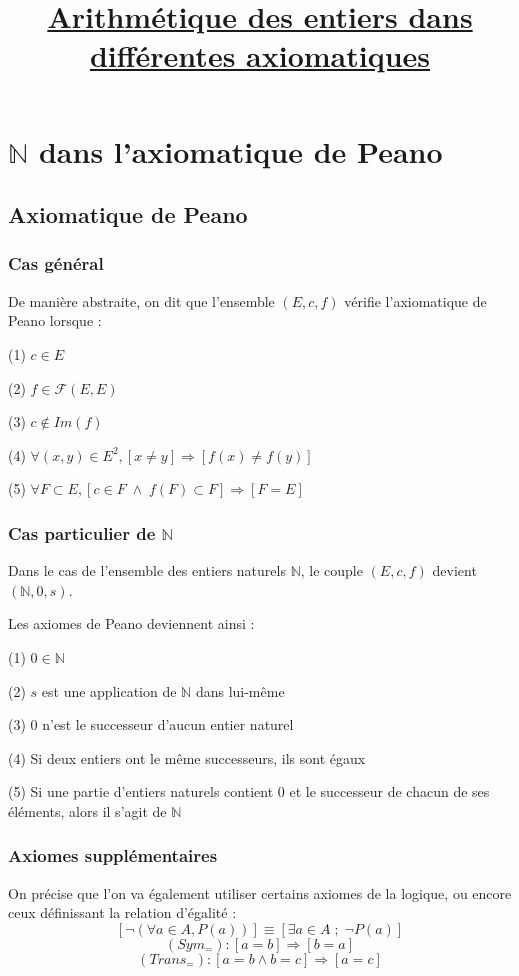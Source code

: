 \documentclass{article}
\title{\underline{Arithmétique des entiers dans différentes axiomatiques}}
\date{}
\begin{document}
\maketitle
\tableofcontents
\section{$\mathbb{N}$ dans l'axiomatique de Peano}
\subsection{Axiomatique de Peano}
\subsubsection{Cas général}
De manière abstraite, on dit que l'ensemble $(E,c,f)$ vérifie l'axiomatique de Peano lorsque :

(1) $c \in E$

(2) $f \in \mathcal{F}(E,E)$

(3) $c \notin Im(f)$

(4) $\forall (x,y) \in E^2, [x \ne y] \Rightarrow [f(x) \ne f(y)]$

(5) $\forall F \subset E, [c \in F \; \wedge \; f(F) \subset F] \Rightarrow [F = E]$

\subsubsection{Cas particulier de $\mathbb{N}$}

Dans le cas de l'ensemble des entiers naturels $\mathbb{N}$, le couple $(E,c,f)$ devient $(\mathbb{N},0,s)$.

Les axiomes de Peano deviennent ainsi :

(1) $0 \in \mathbb{N}$

(2) $s$ est une application de $\mathbb{N}$ dans lui-même

(3) $0$ n'est le successeur d'aucun entier naturel

(4) Si deux entiers ont le même successeurs, ils sont égaux

(5) Si une partie d'entiers naturels contient 0 et le successeur de chacun de ses éléments, alors il s'agit de $\mathbb{N}$

\subsubsection{Axiomes supplémentaires}

On précise que l'on va également utiliser certains axiomes de la logique, ou encore ceux définissant la relation d'égalité :
$$ [\neg(\forall a \in A, P(a))] \equiv [\exists a \in A \; ; \; \neg P(a)] $$
$$(Sym_{=}): [a=b] \Rightarrow [b=a]$$
$$(Trans_{=}) : [a=b \wedge b=c] \Rightarrow [a=c]$$
\end{document}
